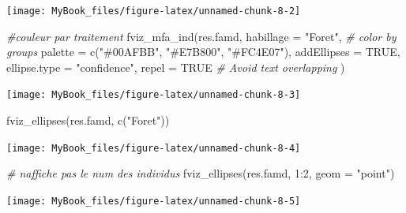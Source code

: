 \documentclass[
  12pt,
  american,
  a4paper,
  extrafontsizes,onecolumn,openright
  ]{memoir}
\newenvironment{Shaded}{\begin{snugshade}}{\end{snugshade}}
\newcommand{\AttributeTok}[1]{\textcolor[rgb]{0.77,0.63,0.00}{#1}}
\newcommand{\CommentTok}[1]{\textcolor[rgb]{0.56,0.35,0.01}{\textit{#1}}}
\newcommand{\ConstantTok}[1]{\textcolor[rgb]{0.00,0.00,0.00}{#1}}
\newcommand{\DecValTok}[1]{\textcolor[rgb]{0.00,0.00,0.81}{#1}}
\newcommand{\FunctionTok}[1]{\textcolor[rgb]{0.00,0.00,0.00}{#1}}
\newcommand{\NormalTok}[1]{#1}
\newcommand{\SpecialCharTok}[1]{\textcolor[rgb]{0.00,0.00,0.00}{#1}}
\newcommand{\StringTok}[1]{\textcolor[rgb]{0.31,0.60,0.02}{#1}}
\begin{document}
\begin{center}\texttt{[image: MyBook\_files/figure-latex/unnamed-chunk-8-2]} \end{center}

\begin{Shaded}
\begin{Highlighting}[]
\CommentTok{\#couleur par traitement}
\FunctionTok{fviz\_mfa\_ind}\NormalTok{(res.famd, }
             \AttributeTok{habillage =} \StringTok{"Foret"}\NormalTok{, }\CommentTok{\# color by groups }
             \AttributeTok{palette =} \FunctionTok{c}\NormalTok{(}\StringTok{"\#00AFBB"}\NormalTok{, }\StringTok{"\#E7B800"}\NormalTok{, }\StringTok{"\#FC4E07"}\NormalTok{),}
             \AttributeTok{addEllipses =} \ConstantTok{TRUE}\NormalTok{, }\AttributeTok{ellipse.type =} \StringTok{"confidence"}\NormalTok{, }
             \AttributeTok{repel =} \ConstantTok{TRUE} \CommentTok{\# Avoid text overlapping}
\NormalTok{             ) }
\end{Highlighting}
\end{Shaded}

\begin{center}\texttt{[image: MyBook\_files/figure-latex/unnamed-chunk-8-3]} \end{center}

\begin{Shaded}
\begin{Highlighting}[]
\FunctionTok{fviz\_ellipses}\NormalTok{(res.famd, }\FunctionTok{c}\NormalTok{(}\StringTok{"Foret"}\NormalTok{))}
\end{Highlighting}
\end{Shaded}

\begin{center}\texttt{[image: MyBook\_files/figure-latex/unnamed-chunk-8-4]} \end{center}

\begin{Shaded}
\begin{Highlighting}[]
\CommentTok{\# n\textquotesingle{}affiche pas le num des individus}
\FunctionTok{fviz\_ellipses}\NormalTok{(res.famd, }\DecValTok{1}\SpecialCharTok{:}\DecValTok{2}\NormalTok{, }\AttributeTok{geom =} \StringTok{"point"}\NormalTok{)}
\end{Highlighting}
\end{Shaded}

\begin{center}\texttt{[image: MyBook\_files/figure-latex/unnamed-chunk-8-5]} \end{center}
\end{document}
